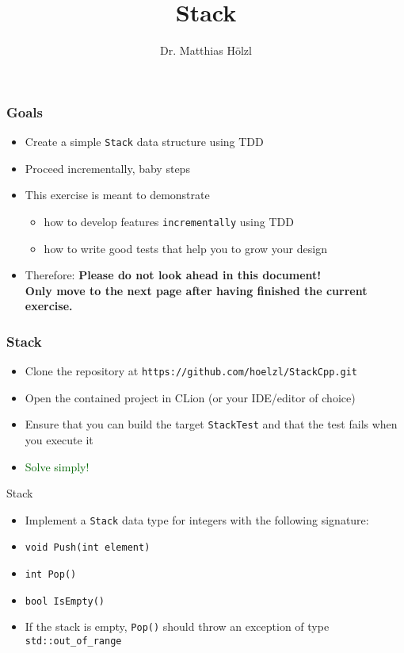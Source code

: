 \documentclass[10pt,aspectratio=169]{beamer}
\begin{document}
\title[Stack]{%
  Stack}
\author{Dr. Matthias Hölzl}

\begin{frame}
  \maketitle
\end{frame}

\begin{frame}[fragile]
  \frametitle{Goals}
  \begin{itemize}
  \item Create a simple \texttt{Stack} data structure using TDD
  \item Proceed incrementally, baby steps\\[1ex]
  
  \item This exercise is meant to demonstrate
    \begin{itemize}
    \item how to develop features \texttt{incrementally} using TDD
    \item how to write good tests that help you to grow your design 
    \end{itemize}
  \item Therefore: \textbf{Please do not look ahead in this document!\\
      Only move to the next page after having finished the current
      exercise.}
  \end{itemize}
\end{frame}


\begin{frame}[fragile]
  \frametitle{Stack}
  \begin{itemize}
  \item Clone the repository at
    \texttt{https://github.com/hoelzl/StackCpp.git}
  \item Open the contained project in CLion (or your IDE/editor of choice)
  \item Ensure that you can build the target \texttt{StackTest} and
    that the test fails when you execute it
  \end{itemize}
  \bigskip
  \begin{itemize}
  \item \textcolor{darkgreen}{Solve simply!}
  \end{itemize}
\end{frame}

\begin{frame}[fragile]{Stack}
\begin{itemize}
\item Implement a \texttt{Stack} data type for integers with the
  following signature:
\item \texttt{void Push(int element)}
\item \texttt{int Pop()}
\item \texttt{bool IsEmpty()}
\item If the stack is empty, \texttt{Pop()} should throw an exception
  of type \verb!std::out_of_range!
\end{itemize}
\end{frame}
\end{document}
